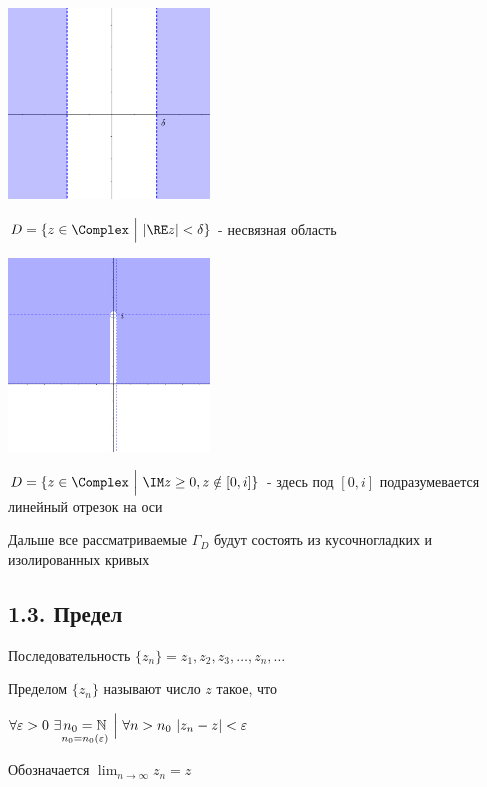 \documentclass[12pt]{article}
\begin{document}
\begin{multicols}{2}
    \includegraphics[width=0.4\textwidth]{addchapters2/images/addchapters2_2025_02_07_3}

     $D = \{z \in \Complex \ \Big| \ |\RE z| < \delta\}$ - несвязная область

    \mediumvspace

    \includegraphics[width=0.4\textwidth]{addchapters2/images/addchapters2_2025_02_07_4}

     $D = \{z \in \Complex \ \Big| \ \IM z \geq 0, z \notin [0, i]\}$ - здесь под $[0, i]$ подразумевается линейный отрезок на оси
\end{multicols}

\Nota Дальше все рассматриваемые $\Gamma_D$ будут состоять из кусочногладких и изолированных кривых

\subsection{1.3. Предел}

\Mem Последовательность $\{z_n\} = z_1, z_2, z_3, \dots, z_n, \dots$

\Def Пределом $\{z_n\}$ называют число $z$ такое, что

$\forall \varepsilon > 0 \ \exists \underset{n_0 = n_0(\varepsilon)}{n_0 = \mathbb{N}} \ \Big| \ \forall n > n_0 \ |z_n - z| < \varepsilon$

Обозначается $\lim_{n \to \infty} z_n = z$
\end{document}

